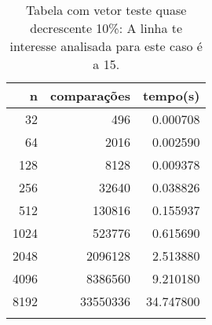 \begin{table}[ht]
\centering
\begin{tabular}{rrr} \toprule
        n &    comparações &       tempo(s) \\ \midrule
      32  &            496 &      0.000708 \\
      64  &           2016 &      0.002590 \\
     128  &           8128 &      0.009378 \\
     256  &          32640 &      0.038826 \\
     512  &         130816 &      0.155937 \\
    1024  &         523776 &      0.615690 \\
    2048  &        2096128 &      2.513880 \\
    4096  &        8386560 &      9.210180 \\
    8192  &       33550336 &     34.747800 \\
\bottomrule\addlinespace
\end{tabular}
\caption{Tabela com vetor teste quase decrescente 10\%: A linha te interesse analisada para este caso é a 15.}
\label{tab:selectionsortQuaseDecresc10}
\end{table}
